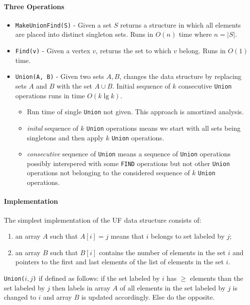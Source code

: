 \paragraph{Three Operations}
\begin{itemize}
    \item \texttt{MakeUnionFind(S)} - Given a set \(S\) returns a structure in which all elements
    are placed into distinct singleton sets. Runs in \(O(n)\) time where \(n = |S|\).
    \item \texttt{Find(v)} - Given a vertex \(v\), returns the set to which
    \(v\) belong. Runs in \(O(1)\) time.
    \item \texttt{Union(A, B)} - Given two sets \(A, B\), changes the data
    structure by replacing sets \(A\) and \(B\) with the set \(A \cup B\). Initial
    sequence of \(k\) consecutive \texttt{Union} operations runs in time \(O(k\lg k)\).
        \begin{itemize}
            \item Run time of single \texttt{Union} not given. This approach is amortized analysis.
            \item \textit{inital} sequence of \(k\) \texttt{Union} operations means we start 
            with all sets being singletons and then apply \(k\) \texttt{Union} operations.
            \item \textit{consecutive} sequence of \texttt{Union} means a sequence of 
            \texttt{Union} operations possibly interspered with some \texttt{FIND} operations
            but not other \texttt{Union} operations not belonging to the considered sequence
            of \(k\) \texttt{Union} operations.
        \end{itemize}
\end{itemize}

\paragraph{Implementation}
The simplest implementation of the UF data structure consists of:
\begin{enumerate}
    \item an array \(A\) such that \(A[i] = j\) means that \(i\) belongs to set labeled by \(j\);
    \item an array \(B\) such that \(B[i]\) contains the number of elements in the set \(i\) and
    pointers to the first and last elements of the list of elements in the set \(i\).
\end{enumerate}
\texttt{Union(\(i, j\))} if defined as follows: if the set labeled by \(i\) has \(\geq\)
elements than the set labeled by \(j\) then labels in array \(A\) of all elements in the set
labeled by \(j\) is changed to \(i\) and array \(B\) is updated accordingly. Else do the 
opposite. 

